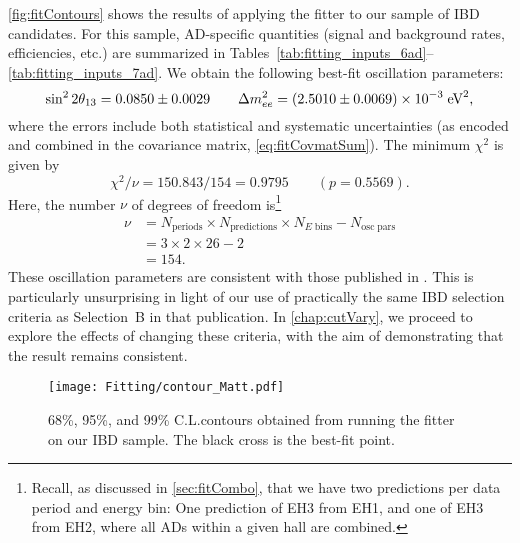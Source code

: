 \documentclass[../thesis.tex]{subfiles}
\begin{document}
\autoref{fig:fitContours} shows the results of applying the fitter to our sample of IBD candidates. For this sample, AD-specific quantities (signal and background rates, efficiencies, etc.) are summarized in Tables~\ref{tab:fitting_inputs_6ad}--\ref{tab:fitting_inputs_7ad}. We obtain the following best-fit oscillation parameters:
\begin{equation}
    \sin^2 2\theta_{13} = 0.0850 \pm 0.0029 \qquad \Delta m^2_{ee} = (2.5010 \pm 0.0069)\times10^{-3}\;\text{eV}^2,
  \label{eq:fitResults}
\end{equation}
where the errors include both statistical and systematic uncertainties (as encoded and combined in the covariance matrix, \autoref{eq:fitCovmatSum}). The minimum $\chi^2$ is given by
\begin{equation}
  \chi^2 / \nu = 150.843 / 154 = 0.9795 \qquad (p = 0.5569).
\end{equation}
Here, the number $\nu$ of degrees of freedom is\footnote{Recall, as discussed in \autoref{sec:fitCombo}, that we have two predictions per data period and energy bin: One prediction of EH3 from EH1, and one of EH3 from EH2, where all ADs within a given hall are combined.}
\begin{equation}
  \begin{aligned}
    \nu &= N_{\mathrm{periods}} \times N_{\mathrm{predictions}} \times N_{E\;\mathrm{bins}} - N_{\mathrm{osc\;pars}} \\
    &= 3 \times 2 \times 26 - 2 \\
    &= 154.
  \end{aligned}
\end{equation}
These oscillation parameters are consistent with those published in \cite{An_2017}. This is particularly unsurprising in light of our use of practically the same IBD selection criteria as Selection~B in that publication. In \autoref{chap:cutVary}, we proceed to explore the effects of changing these criteria, with the aim of demonstrating that the result remains consistent.

\begin{figure}[ht]
  \texttt{[image: Fitting/contour\_Matt.pdf]}
  \caption{68\%, 95\%, and 99\% C.L.\@ contours obtained from running the fitter on our IBD sample. The black cross is the best-fit point.}
  \label{fig:fitContours}
\end{figure}
\end{document}
